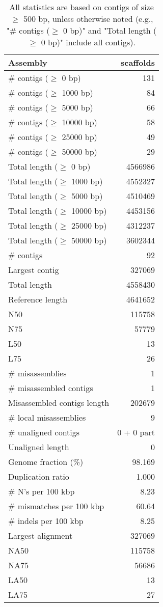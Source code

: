 \documentclass[12pt,a4paper]{article}
\begin{document}
\begin{table}[ht]
\begin{center}
\caption{All statistics are based on contigs of size $\geq$ 500 bp, unless otherwise noted (e.g., "\# contigs ($\geq$ 0 bp)" and "Total length ($\geq$ 0 bp)" include all contigs).}
\begin{tabular}{|l*{1}{|r}|}
\hline
Assembly & scaffolds \\ \hline
\# contigs ($\geq$ 0 bp) & 131 \\ \hline
\# contigs ($\geq$ 1000 bp) & 84 \\ \hline
\# contigs ($\geq$ 5000 bp) & 66 \\ \hline
\# contigs ($\geq$ 10000 bp) & 58 \\ \hline
\# contigs ($\geq$ 25000 bp) & 49 \\ \hline
\# contigs ($\geq$ 50000 bp) & 29 \\ \hline
Total length ($\geq$ 0 bp) & 4566986 \\ \hline
Total length ($\geq$ 1000 bp) & 4552327 \\ \hline
Total length ($\geq$ 5000 bp) & 4510469 \\ \hline
Total length ($\geq$ 10000 bp) & 4453156 \\ \hline
Total length ($\geq$ 25000 bp) & 4312237 \\ \hline
Total length ($\geq$ 50000 bp) & 3602344 \\ \hline
\# contigs & 92 \\ \hline
Largest contig & 327069 \\ \hline
Total length & 4558430 \\ \hline
Reference length & 4641652 \\ \hline
N50 & 115758 \\ \hline
N75 & 57779 \\ \hline
L50 & 13 \\ \hline
L75 & 26 \\ \hline
\# misassemblies & 1 \\ \hline
\# misassembled contigs & 1 \\ \hline
Misassembled contigs length & 202679 \\ \hline
\# local misassemblies & 9 \\ \hline
\# unaligned contigs & 0 + 0 part \\ \hline
Unaligned length & 0 \\ \hline
Genome fraction (\%) & 98.169 \\ \hline
Duplication ratio & 1.000 \\ \hline
\# N's per 100 kbp & 8.23 \\ \hline
\# mismatches per 100 kbp & 60.64 \\ \hline
\# indels per 100 kbp & 8.25 \\ \hline
Largest alignment & 327069 \\ \hline
NA50 & 115758 \\ \hline
NA75 & 56686 \\ \hline
LA50 & 13 \\ \hline
LA75 & 27 \\ \hline
\end{tabular}
\end{center}
\end{table}
\end{document}
